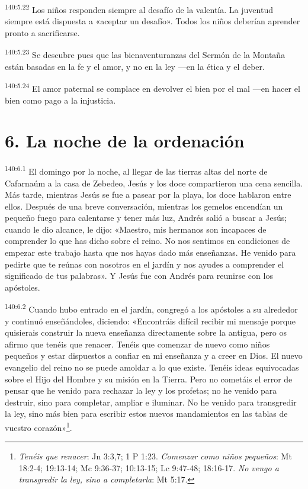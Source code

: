 \par 
\textsuperscript{140:5.22} Los niños responden siempre al desafío de la valentía. La juventud siempre está dispuesta a «aceptar un desafío». Todos los niños deberían aprender pronto a sacrificarse.

\par 
\textsuperscript{140:5.23} Se descubre pues que las bienaventuranzas del Sermón de la Montaña están basadas en la fe y el amor, y no en la ley ---en la ética y el deber.

\par 
\textsuperscript{140:5.24} El amor paternal se complace en devolver el bien por el mal ---en hacer el bien como pago a la injusticia.

\section*{6. La noche de la ordenación}
\par 
\textsuperscript{140:6.1} El domingo por la noche, al llegar de las tierras altas del norte de Cafarnaúm a la casa de Zebedeo, Jesús y los doce compartieron una cena sencilla. Más tarde, mientras Jesús se fue a pasear por la playa, los doce hablaron entre ellos. Después de una breve conversación, mientras los gemelos encendían un pequeño fuego para calentarse y tener más luz, Andrés salió a buscar a Jesús; cuando le dio alcance, le dijo: «Maestro, mis hermanos son incapaces de comprender lo que has dicho sobre el reino. No nos sentimos en condiciones de empezar este trabajo hasta que nos hayas dado más enseñanzas. He venido para pedirte que te reúnas con nosotros en el jardín y nos ayudes a comprender el significado de tus palabras». Y Jesús fue con Andrés para reunirse con los apóstoles.

\par 
\textsuperscript{140:6.2} Cuando hubo entrado en el jardín, congregó a los apóstoles a su alrededor y continuó enseñándoles, diciendo: «Encontráis difícil recibir mi mensaje porque quisierais construir la nueva enseñanza directamente sobre la antigua, pero os afirmo que tenéis que renacer. Tenéis que comenzar de nuevo como niños pequeños y estar dispuestos a confiar en mi enseñanza y a creer en Dios. El nuevo evangelio del reino no se puede amoldar a lo que existe. Tenéis ideas equivocadas sobre el Hijo del Hombre y su misión en la Tierra. Pero no cometáis el error de pensar que he venido para rechazar la ley y los profetas; no he venido para destruir, sino para completar, ampliar e iluminar. No he venido para transgredir la ley, sino más bien para escribir estos nuevos mandamientos en las tablas de vuestro corazón»\footnote{\textit{Tenéis que renacer}: Jn 3:3,7; 1 P 1:23. \textit{Comenzar como niños pequeños}: Mt 18:2-4; 19:13-14; Mc 9:36-37; 10:13-15; Lc 9:47-48; 18:16-17. \textit{No vengo a transgredir la ley, sino a completarla}: Mt 5:17.}.

